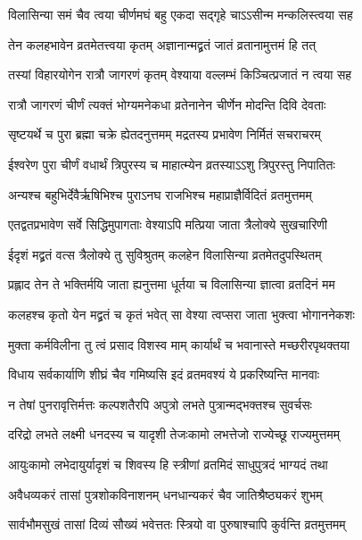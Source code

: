 \twolineshloka
{विलासिन्या समं चैव त्वया चीर्णमघं बहु}
{एकदा सद्गृहे चाऽऽसीन्म मन्कलिस्त्वया सह} %

\twolineshloka
{तेन कलहभावेन व्रतमेतत्त्वया कृतम्}
{अज्ञानान्मद्व्रतं जातं व्रतानामुत्तमं हि तत्} %

\twolineshloka
{तस्यां विहारयोगेन रात्रौ जागरणं कृतम्}
{वेश्याया वल्लम्भं किञ्चित्प्रजातं न त्वया सह} %

\twolineshloka
{रात्रौ जागरणं चीर्णं त्यक्तं भोग्यमनेकधा}
{व्रतेनानेन चीर्णेन मोदन्ति दिवि देवताः} %

\twolineshloka
{सृष्टयर्थे च पुरा ब्रह्मा चक्रे ह्येतदनुत्तमम्}
{मद्रतस्य प्रभावेण निर्मितं सचराचरम्} %

\twolineshloka
{ईश्वरेण पुरा चीर्णं वधार्थं त्रिपुरस्य च}
{माहात्म्येन व्रतस्याऽऽशु त्रिपुरस्तु निपातितः} %

\twolineshloka
{अन्यश्च बहुभिर्देवैर्ऋषिभिश्च पुराऽनघ}
{राजभिश्च महाप्राज्ञैर्विदितं व्रतमुत्तमम्} %

\twolineshloka
{एतद्वतप्रभावेण सर्वे सिद्धिमुपागताः}
{वेश्याऽपि मत्प्रिया जाता त्रैलोक्ये सुखचारिणी} %

\twolineshloka
{ईदृशं मद्व्रतं वत्स त्रैलोक्ये तु सुविश्रुतम्}
{कलहेन विलासिन्या व्रतमेतदुपस्थितम्} %

\twolineshloka
{प्रह्लाद तेन ते भक्तिर्मयि जाता ह्यनुत्तमा}
{धूर्तया च विलासिन्या ज्ञात्वा व्रतदिनं मम} %

\twolineshloka
{कलहश्च कृतो येन मद्व्रतं च कृतं भवेत्}
{सा वेश्या त्वप्सरा जाता भुक्त्वा भोगाननेकशः} %

\twolineshloka
{मुक्ता कर्मविलीना तु त्वं प्रसाद विशस्व माम्}
{कार्यार्थं च भवानास्ते मच्छरीरपृथक्तया} %

\twolineshloka
{विधाय सर्वकार्याणि शीघ्रं चैव गमिष्यसि}
{इदं व्रतमवश्यं ये प्रकरिष्यन्ति मानवाः} %

\twolineshloka
{न तेषां पुनरावृत्तिर्मत्तः कल्पशतैरपि}
{अपुत्रो लभते पुत्रान्मद्भक्तश्च सुवर्चसः} %

\twolineshloka
{दरिद्रो लभते लक्ष्मी धनदस्य च यादृशी}
{तेजःकामो लभत्तेजो राज्येच्छू राज्यमुत्तमम्} %

\twolineshloka
{आयुःकामो लभेदायुर्यादृशं च शिवस्य हि}
{स्त्रीणां व्रतमिदं साधुपुत्रदं भाग्यदं तथा} %

\twolineshloka
{अवैधव्यकरं तासां पुत्रशोकविनाशनम्}
{धनधान्यकरं चैव जातिश्रैष्ठ्यकरं शुभम्} %

\twolineshloka
{सार्वभौमसुखं तासां दिव्यं सौख्यं भवेत्ततः}
{स्त्रियो वा पुरुषाश्चापि कुर्वन्ति व्रतमुत्तमम्} %

